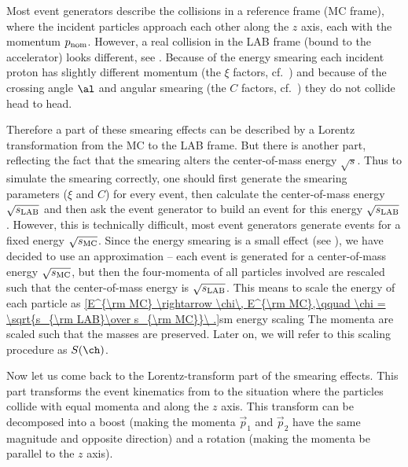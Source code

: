 Most event generators describe the collisions in a reference frame (MC frame), where the incident particles approach each other along the $z$ axis, each with the momentum $p_{\rm nom}$. However, a real collision in the LAB frame (bound to the accelerator) looks different, see . Because of the energy smearing each incident proton has slightly different momentum (the $\xi$ factors, cf.~) and because of the crossing angle $\al$ and angular smearing (the $C$ factors, cf.~) they do not collide head to head.


Therefore a part of these smearing effects can be described by a Lorentz transformation from the MC to the LAB frame. But there is another part, reflecting the fact that the smearing alters the center-of-mass energy $\sqrt s$. Thus to simulate the smearing correctly, one should first generate the smearing parameters ($\xi$ and $C$) for every event, then calculate the center-of-mass energy $\sqrt{s_{\rm LAB}}$ and then ask the event generator to build an event for this energy $\sqrt{s_{\rm LAB}}$. However, this is technically difficult, most event generators generate events for a fixed energy $\sqrt{s_{\rm MC}}$. Since the energy smearing is a small effect (see ), we have decided to use an approximation -- each event is generated for a center-of-mass energy $\sqrt{s_{\rm MC}}$, but then the four-momenta of all particles involved are rescaled such that the center-of-mass energy is $\sqrt{s_{\rm LAB}}$. This means to scale the energy of each particle as
\eqref{E^{\rm MC} \rightarrow \chi\, E^{\rm MC},\qquad \chi = \sqrt{s_{\rm LAB}\over s_{\rm MC}}\ .}{sm energy scaling}
The momenta are scaled such that the masses are preserved. Later on, we will refer to this scaling procedure as $S(\ch)$.

Now let us come back to the Lorentz-transform part of the smearing effects. This part transforms the event kinematics from  to the situation where the particles collide with equal momenta and along the $z$ axis. This transform can be decomposed into a boost (making the momenta $\vec p_1$ and $\vec p_2$ have the same magnitude and opposite direction) and a rotation (making the momenta be parallel to the $z$ axis).

